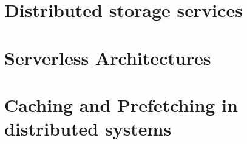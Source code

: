 \section{Distributed storage services}\label{sec:distributedStorage}
\section{Serverless Architectures}\label{sec:serverlessArch}
\section{Caching and Prefetching in distributed systems}\label{sec:cachingDistSys}
